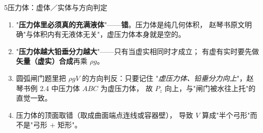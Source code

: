 \begin{kaodian}{5}{压力体：虚体／实体与方向判定}
\begin{yicuo}
\begin{enumerate}
\item "\textbf{压力体里必须真的充满液体}"——\textbf{错}。压力体是纯几何体积，
  赵琴书原文明确"与体积内有无液体无关"，虚压力体本身就是空的。\\
\item "\textbf{压力体越大铅垂分力越大}"——只有当虚实相同时才成立；
  有虚有实时要先做\textbf{矢量（虚实）合成}再乘 $\rho g$。\\
\item 圆弧闸门题里把 $\rho gV$ 的方向判反：只要记住
  "\emph{虚压力体、铅垂分力向上}"，赵琴书例 2.4 中压力体 $ABC$ 为虚压力体，
  故 $P_z$ 向上，与"闸门被水往上托"的直觉一致。\\
\item 压力体的顶面取错（取成曲面端点连线或容器壁），
  导致 $V$ 算成"半个弓形"而不是"弓形 $+$ 矩形"。
\end{enumerate}
\end{yicuo}
\end{kaodian}

